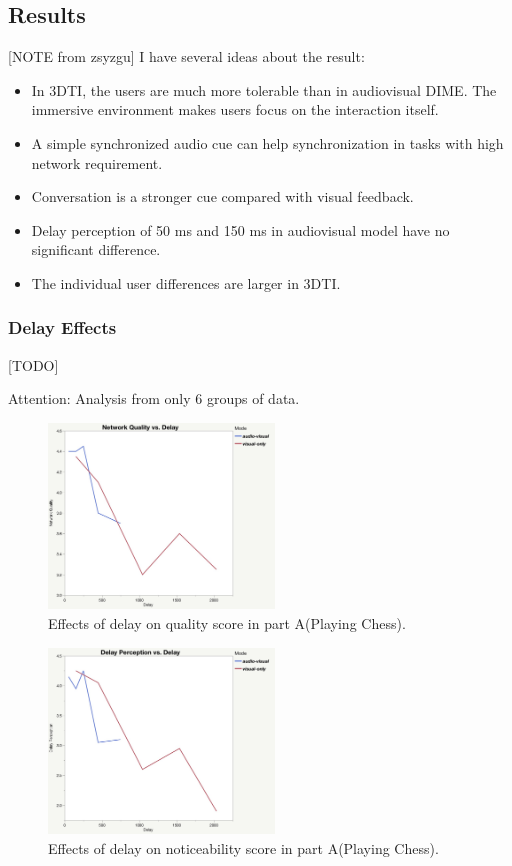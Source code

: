 \subsection{Results}


[NOTE from zsyzgu] I have several ideas about the result:

\begin{itemize}
    \item In 3DTI, the users are much more tolerable than in audiovisual DIME. The immersive environment makes users focus on the interaction itself.
    \item A simple synchronized audio cue can help synchronization in tasks with high network requirement.
    \item Conversation is a stronger cue compared with visual feedback.
    \item Delay perception of 50 ms and 150 ms in audiovisual model have no significant difference.
    \item The individual user differences are larger in 3DTI.
\end{itemize}


\subsubsection{Delay Effects}[TODO]

Attention: Analysis from only 6 groups of data.

\begin{figure}[H]
\centering
\includegraphics[width=6cm]{figures/figure_experiment1_NQ.jpg}
\setlength{\abovecaptionskip}{0.5cm}
\caption{Effects of delay on quality score in part A(Playing Chess).}
\label{4}
\end{figure}

\begin{figure}[H]
\centering
\includegraphics[width=6cm]{figures/figure_experiment1_DP.jpg}
\setlength{\abovecaptionskip}{0.5cm}
\caption{Effects of delay on noticeability score in part A(Playing Chess).}
\label{4}
\end{figure}

